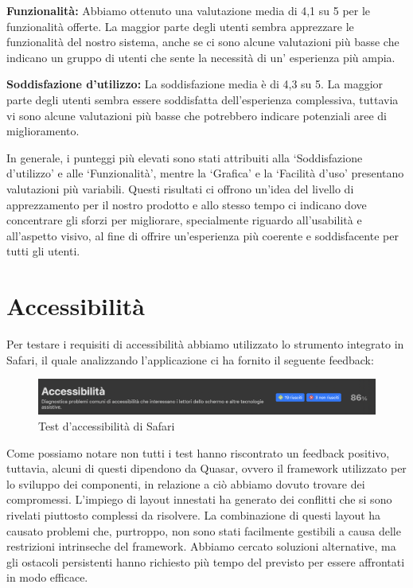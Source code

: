 \textbf{Funzionalità:}
    Abbiamo ottenuto una valutazione media di 4,1 su 5 per le funzionalità offerte. La maggior parte degli utenti sembra apprezzare le funzionalità del nostro sistema, anche se ci sono alcune valutazioni più basse che indicano un gruppo di utenti che sente la necessità di un' esperienza più ampia.
    
\textbf{Soddisfazione d'utilizzo:}
    La soddisfazione media è di 4,3 su 5. La maggior parte degli utenti sembra essere soddisfatta dell'esperienza complessiva, tuttavia vi sono alcune valutazioni più basse che potrebbero indicare potenziali aree di miglioramento.

In generale, i punteggi più elevati sono stati attribuiti alla `Soddisfazione d'utilizzo' e alle `Funzionalità', mentre la `Grafica' e la `Facilità d'uso' presentano valutazioni più variabili.
%
Questi risultati ci offrono un'idea del livello di apprezzamento per il nostro prodotto e allo stesso tempo ci indicano dove concentrare gli sforzi per migliorare, specialmente riguardo all'usabilità e all'aspetto visivo, al fine di offrire un'esperienza più coerente e soddisfacente per tutti gli utenti.

%
%
%
\section{Accessibilità}

Per testare i requisiti di accessibilità abbiamo utilizzato lo strumento integrato in Safari, il quale analizzando l'applicazione ci ha fornito il seguente feedback:

\begin{figure}[H]
    \centering
    \includegraphics[width=1\textwidth]{img/accessibility.png}
    \caption{Test d'accessibilità di Safari}
    \label{fig:mockup-accessibility}
\end{figure}

Come possiamo notare non tutti i test hanno riscontrato un feedback positivo, tuttavia, alcuni di questi dipendono da Quasar, ovvero il framework utilizzato per lo sviluppo dei componenti, in relazione a ciò abbiamo dovuto trovare dei compromessi.
%
L'impiego di layout innestati ha generato dei conflitti che si sono rivelati piuttosto complessi da risolvere.
%
La combinazione di questi layout ha causato problemi che, purtroppo, non sono stati facilmente gestibili a causa delle restrizioni intrinseche del framework.
%
Abbiamo cercato soluzioni alternative, ma gli ostacoli persistenti hanno richiesto più tempo del previsto per essere affrontati in modo efficace.
